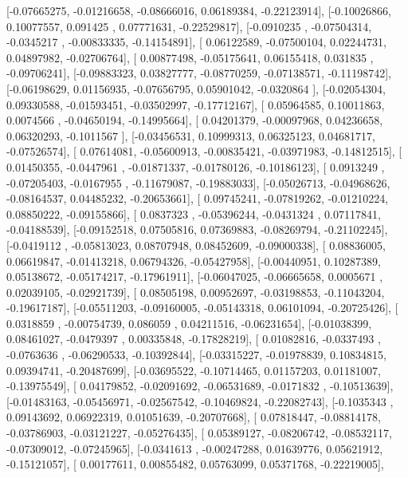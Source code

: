 \documentclass{article}
\begin{document}
       [-0.07665275, -0.01216658, -0.08666016,  0.06189384, -0.22123914],
       [-0.10026866,  0.10077557,  0.091425  ,  0.07771631, -0.22529817],
       [-0.0910235 , -0.07504314, -0.0345217 , -0.00833335, -0.14154891],
       [ 0.06122589, -0.07500104,  0.02244731,  0.04897982, -0.02706764],
       [ 0.00877498, -0.05175641,  0.06155418,  0.031835  , -0.09706241],
       [-0.09883323,  0.03827777, -0.08770259, -0.07138571, -0.11198742],
       [-0.06198629,  0.01156935, -0.07656795,  0.05901042, -0.0320864 ],
       [-0.02054304,  0.09330588, -0.01593451, -0.03502997, -0.17712167],
       [ 0.05964585,  0.10011863,  0.0074566 , -0.04650194, -0.14995664],
       [ 0.04201379, -0.00097968,  0.04236658,  0.06320293, -0.1011567 ],
       [-0.03456531,  0.10999313,  0.06325123,  0.04681717, -0.07526574],
       [ 0.07614081, -0.05600913, -0.00835421, -0.03971983, -0.14812515],
       [ 0.01450355, -0.0447961 , -0.01871337, -0.01780126, -0.10186123],
       [ 0.0913249 , -0.07205403, -0.0167955 , -0.11679087, -0.19883033],
       [-0.05026713, -0.04968626, -0.08164537,  0.04485232, -0.20653661],
       [ 0.09745241, -0.07819262, -0.01210224,  0.08850222, -0.09155866],
       [ 0.0837323 , -0.05396244, -0.0431324 ,  0.07117841, -0.04188539],
       [-0.09152518,  0.07505816,  0.07369883, -0.08269794, -0.21102245],
       [-0.0419112 , -0.05813023,  0.08707948,  0.08452609, -0.09000338],
       [ 0.08836005,  0.06619847, -0.01413218,  0.06794326, -0.05427958],
       [-0.00440951,  0.10287389,  0.05138672, -0.05174217, -0.17961911],
       [-0.06047025, -0.06665658,  0.0005671 ,  0.02039105, -0.02921739],
       [ 0.08505198,  0.00952697, -0.03198853, -0.11043204, -0.19617187],
       [-0.05511203, -0.09160005, -0.05143318,  0.06101094, -0.20725426],
       [ 0.0318859 , -0.00754739,  0.086059  ,  0.04211516, -0.06231654],
       [-0.01038399,  0.08461027, -0.0479397 ,  0.00335848, -0.17828219],
       [ 0.01082816, -0.0337493 , -0.0763636 , -0.06290533, -0.10392844],
       [-0.03315227, -0.01978839,  0.10834815,  0.09394741, -0.20487699],
       [-0.03695522, -0.10714465,  0.01157203,  0.01181007, -0.13975549],
       [ 0.04179852, -0.02091692, -0.06531689, -0.0171832 , -0.10513639],
       [-0.01483163, -0.05456971, -0.02567542, -0.10469824, -0.22082743],
       [-0.1035343 ,  0.09143692,  0.06922319,  0.01051639, -0.20707668],
       [ 0.07818447, -0.08814178, -0.03786903, -0.03121227, -0.05276435],
       [ 0.05389127, -0.08206742, -0.08532117, -0.07309012, -0.07245965],
       [-0.0341613 , -0.00247288,  0.01639776,  0.05621912, -0.15121057],
       [ 0.00177611,  0.00855482,  0.05763099,  0.05371768, -0.22219005],
\end{document}

